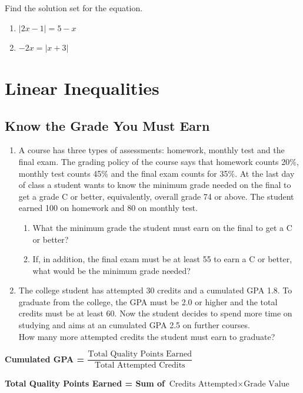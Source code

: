 \documentclass[en,11pt]{elegantbook}
\providecommand{\tightlist}{%
  \setlength{\itemsep}{0pt}\setlength{\parskip}{0pt}}
\newcommand{\size}[2]{{\fontsize{#1}{0}\selectfont#2}}
\newenvironment{rmdthink}{
	\vspace*{0.5\baselineskip}
	\par\noindent
	\makebox[-4pt][r]{\color{green!90}\size{12}{\faLightbulbO}\,\,}
    \begin{tcolorbox}[
    enhanced,
    title={\textbf{\color{second}Think}},
    title style={left color=blue!10!green!20!white,right color=yellow!20!blue!20!white},
    colback=green!20!white,
    ]
    \sffamily
}{
    \end{tcolorbox}
	\par\ignorespacesafterend
}
\let\BeginKnitrBlock\begin \let\EndKnitrBlock\end
\begin{document}
\BeginKnitrBlock{exercise}
\protect\hypertarget{exr:unnamed-chunk-190}{}{\label{exr:unnamed-chunk-190} }
Find the solution set for the equation.

\begin{enumerate}
\def\labelenumi{\arabic{enumi}.}

\item
  \(|2x-1|=5-x\)
\item
  \(-2x=|x+3|\)
\end{enumerate}
\EndKnitrBlock{exercise}

\hypertarget{linear-inequalities}{%
\chapter{Linear Inequalities}\label{linear-inequalities}}

\hypertarget{know-the-grade-you-must-earn}{%
\section{Know the Grade You Must Earn}\label{know-the-grade-you-must-earn}}

\begin{rmdthink}

\begin{enumerate}
\def\labelenumi{\arabic{enumi}.}

\item
  A course has three types of assessments: homework, monthly test and the final exam. The grading policy of the course says that homework counts 20\%, monthly test counts 45\% and the final exam counts for 35\%. At the last day of class a student wants to know the minimum grade needed on the final to get a grade C or better, equivalently, overall grade 74 or above. The student earned 100 on homework and 80 on monthly test.

  \begin{enumerate}
  \def\labelenumii{\arabic{enumii}.}
  \tightlist
  \item
    What the minimum grade the student must earn on the final to get a C or better?
  \item
    If, in addition, the final exam must be at least 55 to earn a C or better, what would be the minimum grade needed?
  \end{enumerate}
\item
  The college student has attempted 30 credits and a cumulated GPA 1.8. To graduate from the college, the GPA must be 2.0 or higher and the total credits must be at least 60. Now the student decides to spend more time on studying and aims at an cumulated GPA 2.5 on further courses.\\
  How many more attempted credits the student must earn to graduate?
\end{enumerate}

\textbf{Cumulated GPA = \(\dfrac{\text{Total Quality Points Earned}}{\text{Total Attempted Credits}}\)}

\textbf{Total Quality Points Earned = Sum of \(\text{Credits Attempted}\times \text{Grade Value}\)}

\end{rmdthink}
\end{document}
